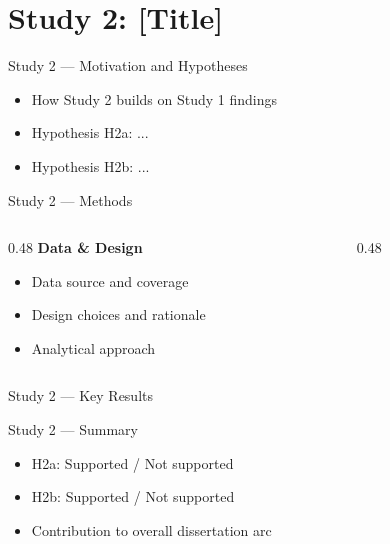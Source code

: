 \documentclass[aspectratio=169,11pt]{beamer}
\begin{document}
\section{Study 2: [Title]}

\begin{frame}{Study 2 — Motivation and Hypotheses}
  \begin{itemize}
    \item How Study 2 builds on Study 1 findings
    \item Hypothesis H2a: ...
    \item Hypothesis H2b: ...
  \end{itemize}
\end{frame}

\begin{frame}{Study 2 — Methods}
  \begin{columns}[T]
    \begin{column}{0.48\textwidth}
      \textbf{Data \& Design}
      \begin{itemize}
        \item Data source and coverage
        \item Design choices and rationale
        \item Analytical approach
      \end{itemize}
    \end{column}
    \begin{column}{0.48\textwidth}
    \end{column}
  \end{columns}
\end{frame}

\begin{frame}{Study 2 — Key Results}
  \begin{center}
  \end{center}
\end{frame}

\begin{frame}{Study 2 — Summary}
  \begin{itemize}
    \item H2a: Supported / Not supported
    \item H2b: Supported / Not supported
    \item Contribution to overall dissertation arc
  \end{itemize}
\end{frame}
\end{document}
